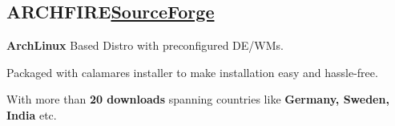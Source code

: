 \documentclass[a4paper,12pt]{article}
\begin{document}
\vspace*{4pt}
\subsection{{ARCHFIRE}\hfill \href{https://sourceforge.net/projects/archfire/}{\textbf{SourceForge}}} 
\begin{zitemize}
  \item \textbf{ArchLinux} Based Distro with preconfigured DE/WMs.
\item Packaged with calamares installer to make installation easy and hassle-free.
\item With more than \textbf{20 downloads} spanning countries like \textbf{Germany, Sweden, India }etc.
\end{zitemize}
\end{document}
